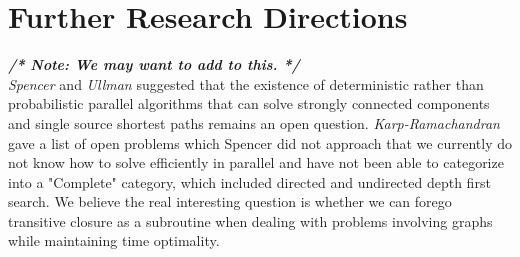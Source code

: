\documentclass[paper=a4, fontsize=11pt]{scrartcl} %
\numberwithin{equation}{section} %
\numberwithin{figure}{section} %
\numberwithin{table}{section} %
\begin{document}

\section{Further Research Directions}
\textbf{\textit{/* Note: We may want to add to this. */}}\\
\textit{Spencer\cite{S97}} and \textit{Ullman\cite{UY91}} suggested that the existence of deterministic rather than probabilistic parallel algorithms that can solve strongly connected components and single source shortest paths remains an open question. \textit{Karp-Ramachandran\cite{KR90}} gave a list of open problems which Spencer did not approach that we currently do not know how to solve efficiently in parallel and have not been able to categorize into a "Complete" category, which included directed and  undirected depth first search. We believe the real interesting question is whether we can forego transitive closure as a subroutine when dealing with problems involving graphs while maintaining time optimality.






\end{document}
